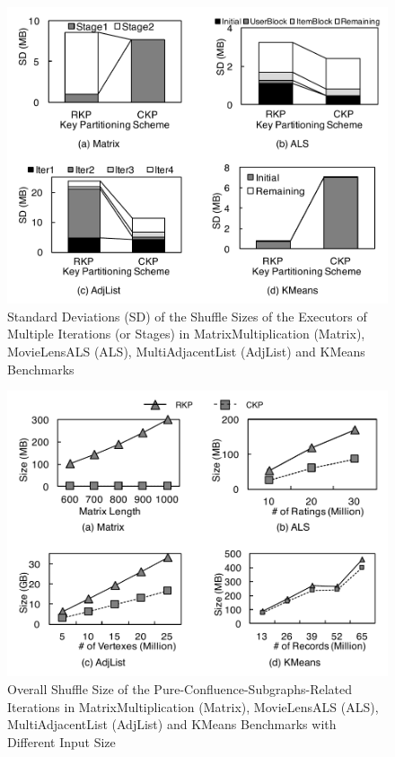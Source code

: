 \documentclass[10pt,journal,compsoc]{IEEEtran}
\begin{document}
\begin{figure}[!t]
\centering
\includegraphics[width=1\columnwidth]{figure6}
\caption{Standard Deviations (SD) of the Shuffle Sizes of the Executors of Multiple Iterations (or Stages) in MatrixMultiplication (Matrix), MovieLensALS (ALS), MultiAdjacentList (AdjList) and KMeans Benchmarks
}
\label{fig:SD}
\end{figure}


\begin{figure}[!t]
\centering
\includegraphics[width=1\columnwidth]{figure7}
\caption{Overall Shuffle Size of the Pure-Confluence-Subgraphs-Related Iterations in MatrixMultiplication (Matrix), MovieLensALS (ALS), MultiAdjacentList (AdjList) and KMeans Benchmarks with Different Input Size}
\label{fig:sizeLine}
\end{figure}
\end{document}
